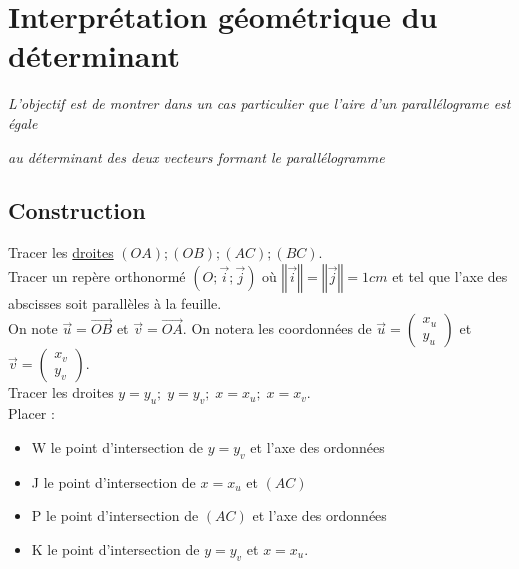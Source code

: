 \documentclass[french]{book}
\newcommand{\norme}[1]{\left\Vert #1\right\Vert}
\begin{document}
\pagestyle{empty}
\section*{Interprétation géométrique du déterminant}
\begin{center}

\textit{L'objectif est de montrer dans un cas particulier que l'aire d'un parallélograme est égale}

 \textit{au déterminant des deux vecteurs formant le parallélogramme}
\end{center}
\subsection*{Construction}

Tracer les \underline{droites} $(OA);(OB);(AC);(BC)$.\\
Tracer un repère orthonormé $(O;\overrightarrow{i};\overrightarrow{j})$ où $\norme{\overrightarrow{i}}=\norme{\overrightarrow{j}}=1cm$ et tel que l'axe des abscisses soit parallèles à la feuille.\\

On note $\overrightarrow{u}=\overrightarrow{OB}$ et $\overrightarrow{v}=\overrightarrow{OA}$. On notera les coordonnées de $\overrightarrow{u}=\left( \begin{array}{c}
x_u\\
y_u
\end{array} \right)
$ et $\overrightarrow{v}=\left( \begin{array}{c}
x_v\\
y_v
\end{array} \right)$. \\

Tracer les droites $y=y_u; \; y=y_v; \; x=x_u; \; x=x_v$.\\

Placer : 
\begin{itemize}
\item W le point d'intersection de $y=y_v$ et l'axe des ordonnées
\item J le point d'intersection de $x=x_u$ et $(AC)$
\item P le point d'intersection de $(AC)$ et l'axe des ordonnées
\item K le point d'intersection de $y=y_v$ et $x=x_u$.\\
\end{itemize} 
\end{document}
